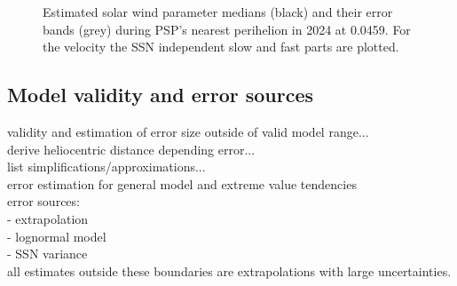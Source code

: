 \begin{figure}
	\caption{Estimated solar wind parameter medians (black) and their error bands (grey) during PSP's nearest perihelion in 2024 at \SI{0.0459}{\au}. For the velocity the SSN independent slow and fast parts are plotted.}
	\label{fig:SPP_perihelia_prediction_nearest_d_plot}
\end{figure}

\subsection{Model validity and error sources}
\label{sec:model_validity_and_errors}

validity and estimation of error size outside of valid model range...\\
derive heliocentric distance depending error...\\

list simplifications/approximations...\\

error estimation for general model and extreme value tendencies\\

error sources:\\
- extrapolation\\
- lognormal model\\
- SSN variance\\

all estimates outside these boundaries are extrapolations with large uncertainties.\\

